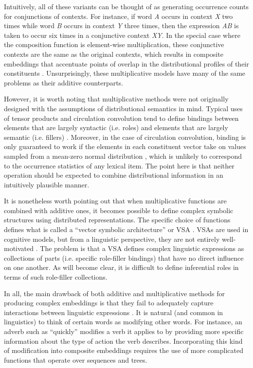 Intuitively, all of these variants can be thought of as generating occurrence counts for conjunctions of contexts. For instance, if word \textit{A} occurs in context \textit{X} two times while word \textit{B} occurs in context \textit{Y} three times, then the expression \textit{AB} is taken to occur six times in a conjunctive context \textit{XY}. In the special case where the composition function is element-wise multiplication, these conjunctive contexts are the same as the original contexts, which results in composite embeddings that accentuate points of overlap in the distributional profiles of their constituents \citep{Baroni:2014,Mitchell:2010}. Unsurprisingly, these multiplicative models have many of the same problems as their additive counterparts.

However, it is worth noting that multiplicative methods were not originally designed with the assumptions of distributional semantics in mind. Typical uses of tensor products and circulation convolution tend to define bindings between elements that are largely syntactic (i.e. roles) and elements that are largely semantic (i.e. fillers) \citep{SmolenskyLegendre:2006,Plate:2003}. Moreover, in the case of circulation convolution, binding is only guaranteed to work if the elements in each constituent vector take on values sampled from a mean-zero normal distribution \citep{Plate:2003}, which is unlikely to correspond to the occurrence statistics of any lexical item. The point here is that neither operation should be expected to combine distributional information in an intuitively plausible manner.

It is nonetheless worth pointing out that when multiplicative functions are combined with additive ones, it becomes possible to define complex symbolic structures using distributed representations. The specific choice of functions defines what is called a ``vector symbolic architecture'' or VSA \citep{Gayler:2004}. VSAs are used in cognitive models, but from a linguistic perspective, they are not entirely well-motivated \citep{Eliasmith:2013}. The problem is that a VSA defines complex linguistic expressions as collections of parts (i.e. specific role-filler bindings) that have no direct influence on one another. As will become clear, it is difficult to define inferential roles in terms of such role-filler collections. 

In all, the main drawback of both additive and multiplicative methods for producing complex embeddings is that they fail to adequately capture interactions between linguistic expressions \citep{Baroni:2014}. It is natural (and common in linguistics) to think of certain words as modifying other words. For instance, an adverb such as ``quickly'' modifies a verb it applies to by providing more specific information about the type of action the verb describes. Incorporating this kind of modification into composite embeddings requires the use of more complicated functions that operate over sequences and trees. 

